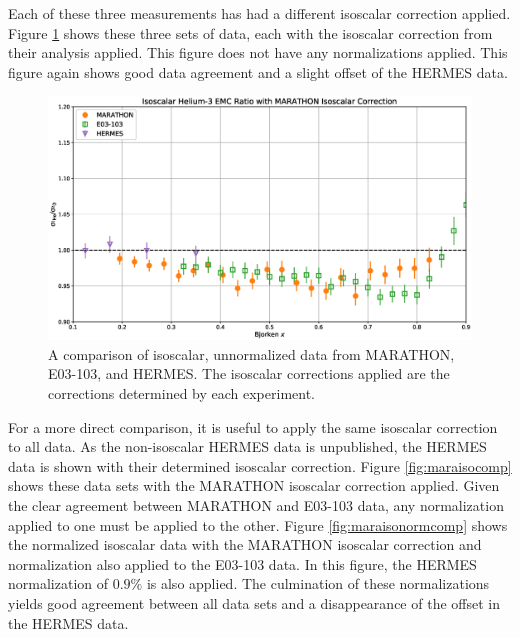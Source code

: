 Each of these three measurements has had a different isoscalar correction applied. Figure \ref{fig:isocomp} shows these three sets of data, each with the isoscalar correction from their analysis applied. This figure does not have any normalizations applied. This figure again shows good data agreement and a slight offset of the HERMES data.

\begin{figure}[p]
	\includegraphics[width=\textwidth]{./results/fig/iso_comp.eps}
	\caption{A comparison of isoscalar, unnormalized data from MARATHON, E03-103, and HERMES. The isoscalar corrections applied are the corrections determined by each experiment.}
	\label{fig:isocomp}
\end{figure}

For a more direct comparison, it is useful to apply the same isoscalar correction to all data. As the non-isoscalar HERMES data is unpublished, the HERMES data is shown with their determined isoscalar correction. Figure \ref{fig:maraisocomp} shows these data sets with the MARATHON isoscalar correction applied. Given the clear agreement between MARATHON and E03-103 data, any normalization applied to one must be applied to the other. Figure \ref{fig:maraisonormcomp} shows the normalized isoscalar data with the MARATHON isoscalar correction and normalization also applied to the E03-103 data. In this figure, the HERMES normalization of $0.9\%$ is also applied. The culmination of these normalizations yields good agreement between all data sets and a disappearance of the offset in the HERMES data.

